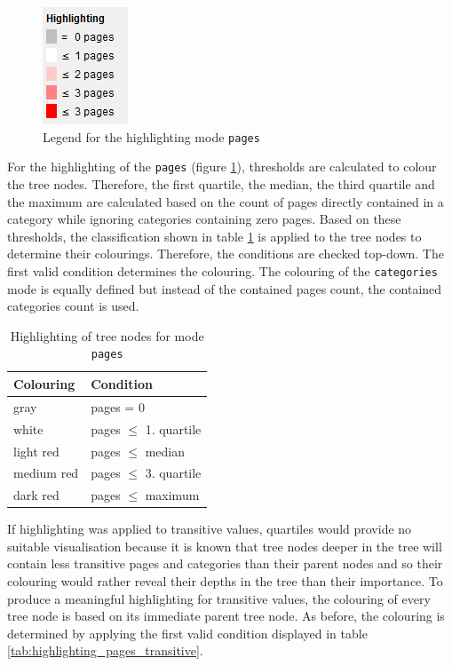 \documentclass{scrartcl}
\begin{document}
\begin{figure}[ht]
\centering
\includegraphics[scale=0.6]{figures/highlighting_pages.png}
\caption{Legend for the highlighting mode \texttt{pages}}
\label{fig:highlighting_pages}
\end{figure}

For the highlighting of the \texttt{pages} (figure \ref{fig:highlighting_pages}), thresholds are calculated to colour the tree nodes. Therefore, the first quartile, the median, the third quartile and the maximum are calculated based on the count of pages directly contained in a category while ignoring categories containing zero pages. Based on these thresholds, the classification shown in table \ref{tab:highlighting_pages} is applied to the tree nodes to determine their colourings. Therefore, the conditions are checked top-down. The first valid condition determines the colouring. The colouring of the \texttt{categories} mode is equally defined but instead of the contained pages count, the contained categories count is used.

\begin{table}[ht]
\scriptsize
\centering
\begin{tabular}{ll}
\toprule 
\textbf{Colouring} & \textbf{Condition} \\
\midrule
gray & pages = 0 \\ 
\midrule
white & pages $\le$ 1. quartile \\ 
\midrule
light red & pages $\le$ median \\ 
\midrule
medium red & pages $\le$ 3. quartile \\ 
\midrule
dark red & pages $\le$ maximum \\ 
\bottomrule
\end{tabular} 
\caption{Highlighting of tree nodes for mode \texttt{pages}}
\label{tab:highlighting_pages}
\end{table}

If highlighting was applied to transitive values, quartiles would provide no suitable visualisation because it is known that tree nodes deeper in the tree will contain less transitive pages and categories than their parent nodes and so their colouring would rather reveal their depths in the tree than their importance. To produce a meaningful highlighting for transitive values, the colouring of every tree node is based on its immediate parent tree node. As before, the colouring is determined by applying the first valid condition displayed in table \ref{tab:highlighting_pages_transitive}.
\end{document}
